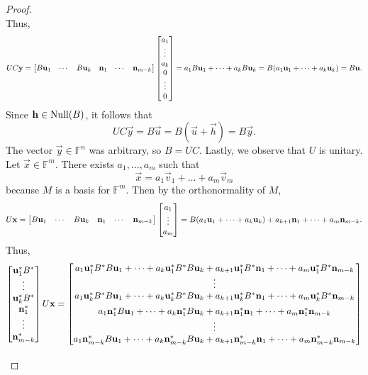 \documentclass{homework}
\begin{document}
\begin{proof}
\begin{equation*}
		\end{equation*}
		Thus,
		\begin{equation*}
			UC\mathbf{y} = \left[\begin{matrix}B\mathbf{u}_1 & \cdots & B\mathbf{u}_k & \mathbf{n}_1 & \cdots & \mathbf{n}_{m-k}\end{matrix}\right] \left[\begin{matrix}a_1 \\ \vdots \\ a_k \\ 0 \\ \vdots \\ 0\end{matrix}\right] = a_1B\mathbf{u}_1 + \dots + a_kB\mathbf{u}_k = B(a_1\mathbf{u}_1 + \dots + a_k \mathbf{u}_k) = B\mathbf{u}.
		\end{equation*}
		Since $\mathbf{h} \in \mathrm{Null}(B)$, it follows that
		\begin{equation*}
			UC\vec{y} = B\vec{u} = B(\vec{u} + \vec{h}) = B\vec{y}.
		\end{equation*}
		The vector $\vec{y} \in \mathbb{F}^n$ was arbitrary, so $B = UC$. Lastly, we observe that $U$ is unitary. Let $\vec{x} \in \mathbb{F}^m$. There exists $a_1, \dots, a_m$ such that
		\begin{equation*}
			\vec{x} = a_1\vec{v}_1 + \dots + a_m \vec{v}_m
		\end{equation*}
		because $M$ is a basis for $\mathbb{F}^m$. Then by the orthonormality of $M$,
		\begin{equation*}
			U\mathbf{x} = \left[\begin{matrix}B\mathbf{u}_1&\cdots&B\mathbf{u}_k&\mathbf{n}_1 & \cdots&\mathbf{n}_{m-k}\end{matrix}\right]\left[\begin{matrix}a_1 \\ \vdots \\ a_m\end{matrix}\right] = B(a_1\mathbf{u}_1 + \dots + a_k\mathbf{u}_k) + a_{k+1}\mathbf{n}_1 + \dots +a_m\mathbf{n}_{m-k}.
		\end{equation*}
		Thus,
		\begin{equation*}
			\begin{aligned}
			\mat{\vec{u}_1^*B^* \\ \vdots \\ \vec{u}_k^*B^* \\ \vec{n}_1^* \\ \vdots \\ \vec{n}_{m-k}^*} U\vec{x} &= \mat{a_1\vec{u}_1^*B^*B\vec{u}_1 + \dots  + a_k\vec{u}_1^*B^*B\vec{u}_k + a_{k+1}\vec{u}_1^*B^*\vec{n}_1 + \dots + a_m\vec{u}_1^*B^*\vec{n}_{m-k} \\ \vdots \\ a_1\vec{u}_k^*B^*B\vec{u}_1 + \dots  + a_k\vec{u}_k^*B^*B\vec{u}_k + a_{k+1}\vec{u}_k^*B^*\vec{n}_1 + \dots + a_m\vec{u}_k^*B^*\vec{n}_{m-k} \\[0.5em] a_1\vec{n}_1^*B\vec{u}_1 + \dots + a_k\vec{n}_1^*B\vec{u}_k + a_{k+1}\vec{n}_1^*\vec{n}_1 + \dots + a_m\vec{n}_{1}^*\vec{n}_{m-k} \\ \vdots \\ a_1\vec{n}_{m-k}^*B\vec{u}_1 + \dots + a_k\vec{n}_{m-k}^*B\vec{u}_k + a_{k+1}\vec{n}_{m-k}^*\vec{n}_1 + \dots + a_m\vec{n}_{m-k}^*\vec{n}_{m-k} } \\[0.7em]

\end{aligned}
\end{equation*}
\end{proof}
\end{document}
